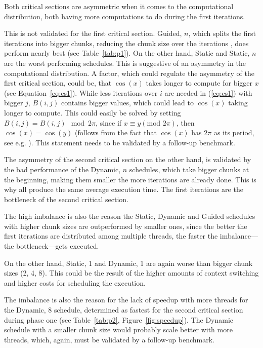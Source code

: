\documentclass[twoside,11pt]{article}
\begin{document}
Both critical sections are asymmetric when it comes to the
computational distribution, both having more computations
to do during the first iterations.

This is not validated for the first critical section.
Guided, $n$, which splits the first iterations into bigger
chunks, reducing the chunk size over the iterations
\citep[see][]{lecture}, does perform nearly best (see
Table~\ref{tab:p1}).
On the other hand, Static and Static, $n$ are the worst
performing schedules. This is suggestive of an asymmetry
in the computational distribution.
A factor, which could regulate the asymmetry of the
first critical section, could be, that $\cos(x)$ takes
longer to compute for bigger $x$
(see Equation~\ref{eq:cs1}).
While less iterations over $i$ are needed in
(\ref{eq:cs1}) with bigger $j$, $B(i, j)$ contains bigger
values, which could lead to $\cos(x)$ taking longer to
compute.
This could easily be solved by
setting $B(i, j) = B(i, j) \mod 2\pi$, since if
$x \equiv y (\text{mod }2\pi)$, then $\cos(x) = \cos(y)$
(follows from the fact that $\cos(x)$ has $2\pi$ as its
period, see e.g. \citet{trig}).
This statement needs to be validated by a follow-up
benchmark.

The asymmetry of the second critical section on the other
hand, is validated by the bad performance of the Dynamic,
$n$ schedules, which take bigger chunks at the beginning,
making them smaller the more iterations are already done.
This is why all produce the same average execution time.
The first iterations are the bottleneck of the second
critical section.

The high imbalance is also the reason the Static, Dynamic
and Guided schedules with higher chunk sizes are
outperformed by smaller ones, since the better the first
iterations are distributed among multiple threads, the
faster the imbalance---the bottleneck---gets executed.

On the other hand, Static, 1 and Dynamic, 1 are again
worse than bigger chunk sizes (2, 4, 8).
This could be the result of the higher amounts of context
switching and higher costs for scheduling the execution.

The imbalance is also the reason for the lack of speedup
with more threads for the Dynamic, 8 schedule, determined
as fastest for the second critical section during phase one
(see Table~\ref{tab:p2}, Figure~\ref{fig:speedup}).
The Dynamic schedule with a smaller chunk size would
probably scale better with more threads, which, again,
must be validated by a follow-up benchmark.
\end{document}
